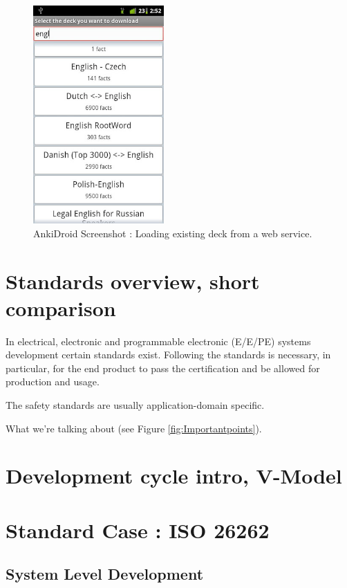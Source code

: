 \documentclass[a4paper,11pt,twoside]{article}
\begin{document}
\begin{figure}[t]
\centering
\label{fig:Downloddeck}
\includegraphics[width=5cm]{Screenshot3}
\caption{AnkiDroid Screenshot : Loading existing deck from a web service.}
\end{figure}




\section{Standards overview, short comparison}


In electrical, electronic and programmable electronic  (E/E/PE) systems development certain standards
exist. Following the standards is necessary, in particular, for the end product to pass the certification
and be allowed for production and usage.

The safety standards are usually application-domain specific.

What we're talking about (see Figure \ref{fig:Importantpoints}).


\section{Development cycle intro, V-Model}


\section{Standard Case : ISO 26262}
\subsection{System Level Development}
\end{document}
